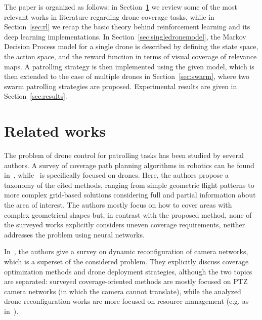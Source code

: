 \documentclass{article}
\begin{document}

The paper is organized as follows: in Section~\ref{sec:sota} we review some of the most relevant works in literature regarding drone coverage tasks, while in Section~\ref{sec:rl} we recap the basic theory behind reinforcement learning and its deep learning implementations. In Section~\ref{sec:singledronemodel}, the Markov Decision Process model for a single drone is described by defining the state space, the action space, and the reward function in terms of visual coverage of relevance maps. A patrolling strategy is then implemented using the given model, which is then extended to the case of multiple drones in Section~\ref{sec:swarm}, where two swarm patrolling strategies are proposed. Experimental results are given in Section~\ref{sec:results}.


\section{Related works}
\label{sec:sota}

The problem of drone control for patrolling tasks has been studied by several authors. A survey of coverage path planning algorithms in robotics can be found in~\cite{galceran2013survey}, while~\cite{cabreira2019survey} is specifically focused on drones. Here, the authors propose a taxonomy of the cited methods, ranging from simple geometric flight patterns to more complex grid-based solutions considering full and partial information about the area of interest. The authors mostly focus on how to cover areas with complex geometrical shapes but, in contrast with the proposed method, none of the surveyed works explicitly considers uneven coverage requirements, neither addresses the problem using neural networks.

In~\cite{Piciarelli2016-dynamic}, the authors give a survey on dynamic reconfiguration of camera networks, which is a superset of the considered problem. They explicitly discuss coverage optimization methods and drone deployment strategies, although the two topics are separated: surveyed coverage-oriented methods are mostly focused on PTZ camera networks (in which the camera cannot translate), while the analyzed drone reconfiguration works are more focused on resource management (e.g. as in~\cite{yanmaz2018drone,wischounig-Strucl2015resource}). 
\end{document}
